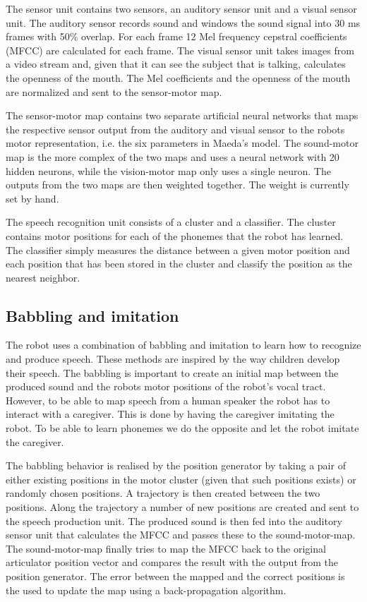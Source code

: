The sensor unit contains two sensors, an auditory sensor unit and a
visual sensor unit. The auditory sensor records sound and windows the
sound signal into 30 ms frames with 50\% overlap. For each frame 12
Mel frequency cepstral coefficients (MFCC) are calculated for each
frame. The visual sensor unit takes images from a video stream and,
given that it can see the subject that is talking, calculates the
openness of the mouth. The Mel coefficients and the openness of the
mouth are normalized and sent to the sensor-motor map.

The sensor-motor map contains two separate artificial neural networks
that maps the respective sensor output from the auditory and visual
sensor to the robots motor representation, i.e. the six parameters in
Maeda's model. The sound-motor map is the more complex of the two maps
and uses a neural network with 20 hidden neurons, while the
vision-motor map only uses a single neuron. The outputs from the two
maps are then weighted together. The weight is currently set by hand.

The speech recognition unit consists of a cluster and a
classifier. The cluster contains motor positions for each of the
phonemes that the robot has learned. The classifier simply measures the
distance between a given motor position and each position that has
been stored in the cluster and classify the position as the nearest
neighbor.
 
\subsection{Babbling and imitation}
The robot uses a combination of babbling and imitation to learn how to
recognize and produce speech. These methods are inspired by the way
children develop their speech. The babbling is important to create an
initial map between the produced sound and the robots motor positions
of the robot's vocal tract. However, to be able to map speech from a
human speaker the robot has to interact with a caregiver. This is done
by having the caregiver imitating the robot. To be able to learn
phonemes we do the opposite and let the robot imitate the caregiver.

The babbling behavior is realised by the position generator by taking
a pair of either existing positions in the motor cluster (given that
such positions exists) or randomly chosen positions. A trajectory is
then created between the two positions. Along the trajectory a number
of new positions are created and sent to the speech production
unit. The produced sound is then fed into the auditory sensor unit
that calculates the MFCC and passes these to the sound-motor-map. The
sound-motor-map finally tries to map the MFCC back to the original
articulator position vector and compares the result with the output
from the position generator. The error between the mapped and the
correct positions is the used to update the map using a
back-propagation algorithm.

